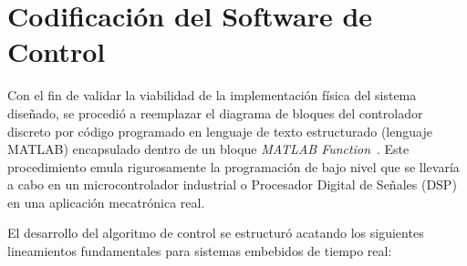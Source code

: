 \documentclass[12pt, a4paper,journal, onecolumn, compsoc]{IEEEtran}
\begin{document}
\section{Codificación del Software de Control}

Con el fin de validar la viabilidad de la implementación física del sistema diseñado, se procedió a reemplazar el diagrama de bloques del controlador discreto por código programado en lenguaje de texto estructurado (lenguaje MATLAB) encapsulado dentro de un bloque \textit{MATLAB Function}~\cite{guia_trabajo}. Este procedimiento emula rigurosamente la programación de bajo nivel que se llevaría a cabo en un microcontrolador industrial o Procesador Digital de Señales (DSP) en una aplicación mecatrónica real.

El desarrollo del algoritmo de control se estructuró acatando los siguientes lineamientos fundamentales para sistemas embebidos de tiempo real:
\end{document}
